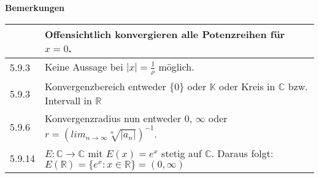 \begin{table}[H]
\begin{tabularx}{\textwidth}{X m{16cm}}
        \bottomrule
    \end{tabularx}
    \end{table}

    \noindent
    \textbf{Bemerkungen}
    \begin{table}[H]
    \begin{tabularx}{\textwidth}{X m{16cm}}
        \toprule

              & Offensichtlich konvergieren alle Potenzreihen für $x = 0$. \\
        \midrule
        5.9.3 & Keine Aussage bei $|x|=\frac{1}{\rho}$ möglich. \\
        \midrule
        5.9.3 & Konvergenzbereich entweder $\{0\}$ oder $\mathbb{K}$ oder Kreis in $\mathbb{C}$ bzw. Intervall in $\mathbb{R}$ \\
        \midrule
        5.9.6 & Konvergenzradius nun entweder $0$, $\infty$ oder $r = (lim_{n \rightarrow \infty} \sqrt[n]{|a_n|})^{-1}$. \\
        \midrule
        5.9.14& $E: \mathbb{C} \rightarrow \mathbb{C}$ mit $E(x) = e^x$ stetig auf $\mathbb{C}$. \hfill \break
                Daraus folgt: $E(\mathbb{R}) = \{e^x: x \in \mathbb{R}\} = (0, \infty)$ \\ 

        \bottomrule
    \end{tabularx}
    \end{table}

    \pagebreak


